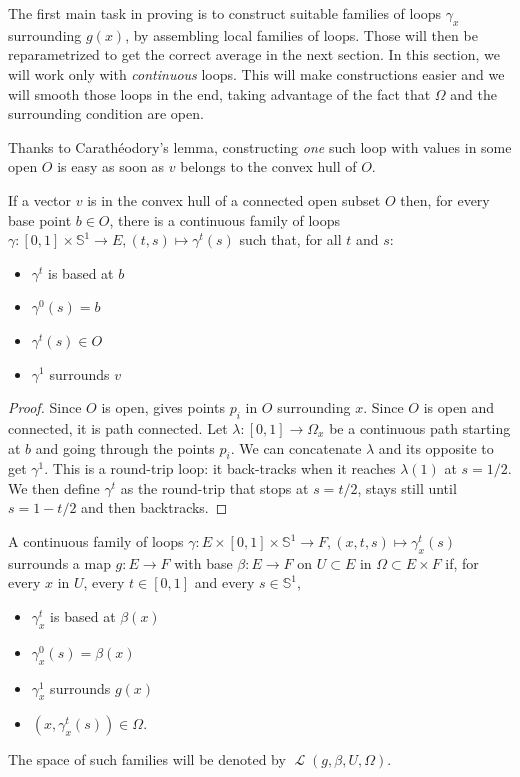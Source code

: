 \documentclass[10pt,a4paper]{article}
\newcommand{\co}{\!:}
\DeclareMathOperator{\Loop}{\mathcal{L}}
\newcommand{\uses}[1]{}
\newcommand{\lean}[1]{}
\newcommand{\leanok}{}
\begin{document}
The first main task in proving  is to construct
suitable families of loops $γ_x$ surrounding $g(x)$, by assembling local
families of loops.
Those will then be reparametrized to get the correct average in the next
section.
In this section, we will work only with \emph{continuous} loops.
This will make constructions easier and we will smooth those loops
in the end, taking advantage of the fact that $Ω$ and the surrounding
condition are open.

Thanks to Carathéodory's lemma, constructing \emph{one} such loop
with values in some open $O$ is easy as soon as $v$ belongs to the
convex hull of $O$.

\begin{lemma}
  \label{lem:loop_of_hull}
  \uses{def:surrounds}
  \lean{surrounding_loop_of_convexHull}
  \leanok
  If a vector $v$ is in the convex hull of a connected open subset $O$
  then, for every base point $b ∈ O$, there is a continuous
  family of loops
  $γ \co [0, 1] × 𝕊^1 → E, (t, s) ↦ γ^t(s)$ such that, for all $t$ and
  $s$:
  \begin{itemize}
    \item
      $γ^t$ is based at $b$
    \item
      $γ^0(s) = b$
    \item
      $γ^t(s) ∈ O$
    \item
      $γ^1$ surrounds $v$
  \end{itemize}
\end{lemma}

\begin{proof}
  \uses{prop:surrounded_by_open}
  \leanok
  Since $O$ is open,  gives points $p_i$ in $O$
  surrounding $x$.
  Since $O$ is open and connected, it is path connected.
  Let $λ \co [0, 1] → Ω_x$ be a continuous path starting at $b$ and
  going through the points $p_i$.
  We can concatenate $λ$ and its opposite to get $γ^1$.
  This is a round-trip loop: it back-tracks when it reaches $λ(1)$
  at $s = 1/2$.
  We then define $γ^t$ as the round-trip that stops at $s = t/2$, stays
  still until $s = 1-t/2$ and then backtracks.
\end{proof}


\begin{definition}
  \label{def:family_surrounds}
  \uses{def:surrounds}
  \lean{SurroundingFamily}
  \leanok
  A continuous family of loops $γ \co E × [0, 1] × 𝕊^1 → F, (x, t, s) ↦ γ^t_x(s)$
  surrounds a map $g \co E → F$ with base $β \co E → F$
  on $U ⊂ E$ in $Ω ⊂ E × F$ if, for every $x$ in $U$, every $t ∈ [0, 1]$ and every
  $s ∈ 𝕊^1$,
  \begin{itemize}
    \item
      $γ^t_x$ is based at $β(x)$
    \item
      $γ^0_x(s) = β(x)$
    \item
      $γ^1_x$ surrounds $g(x)$
    \item
      $(x,γ^t_x(s)) ∈ Ω$.
  \end{itemize}
  The space of such families will be denoted by
  $\Loop(g, β, U, Ω)$.
\end{definition}
\end{document}
